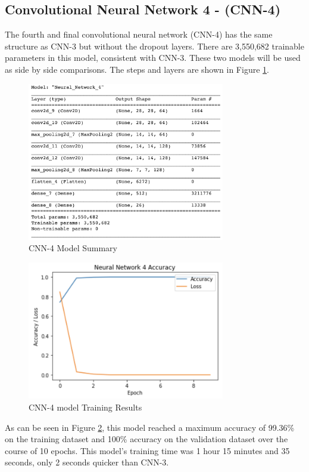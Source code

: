 \documentclass[5p,authoryear]{elsarticle}
\begin{document}
\subsection{Convolutional Neural Network 4 - (CNN-4)}


The fourth and final convolutional neural network (CNN-4) has the same structure as CNN-3 but without the dropout layers. There are 3,550,682 trainable parameters in this model, consistent with CNN-3. These two models will be used as side by side comparisons. The steps and layers are shown in Figure \ref{CNN-4 Model Summary}.


\begin{figure}[!htb] \centering
	\includegraphics[width=3.4in]{figures/CNN-4-Summary.png}
	\caption[]{CNN-4 Model Summary} 
	\label{CNN-4 Model Summary} 
\end{figure}


\begin{figure}[!htb] \centering
	\includegraphics[width=3.4in]{figures/CNN-4-training.png}
	\caption[]{CNN-4 model Training Results} 
	\label{CNN-4 model Training Results} 
\end{figure}


As can be seen in Figure \ref{CNN-4 model Training Results}, this model reached a maximum accuracy of 99.36\% on the training dataset and 100\% accuracy on the validation dataset over the course of 10 epochs. This model’s training time was 1 hour 15 minutes and 35 seconds, only 2 seconds quicker than CNN-3.
\end{document}

